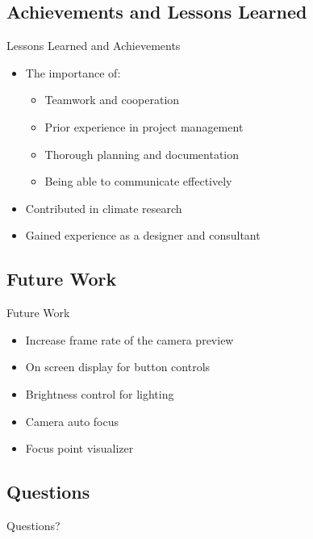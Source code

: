 \documentclass[17pt, aspectratio=169]{beamer}
\begin{document}
\subsection{Achievements and Lessons Learned}
\begin{frame}{Lessons Learned and Achievements}
	\begin{itemize}
		\item The importance of:
		      \begin{itemize}
			      \item Teamwork and cooperation
			      \item Prior experience in project management
			      \item Thorough planning and documentation
			      \item Being able to communicate effectively
		      \end{itemize}
		\item Contributed in climate research
		\item Gained experience as a designer and consultant
	\end{itemize}
\end{frame}
\subsection{Future Work}
\begin{frame}{Future Work}
	\begin{itemize}
		\item Increase frame rate of the camera preview
		\item On screen display for button controls
		\item Brightness control for lighting
		\item Camera auto focus
		\item Focus point visualizer
	\end{itemize}
\end{frame}
\subsection{Questions}
\begin{frame}
	\begin{center}
		\huge Questions?
	\end{center}
\end{frame}
\end{document}
